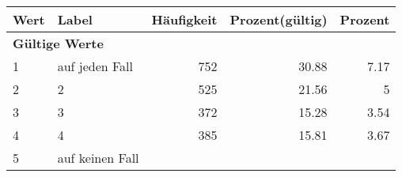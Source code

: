      \begin{longtable}{lXrrr}
     \toprule
     \textbf{Wert} & \textbf{Label} & \textbf{Häufigkeit} & \textbf{Prozent(gültig)} & \textbf{Prozent} \\
     \endhead
     \midrule
     \multicolumn{5}{l}{\textbf{Gültige Werte}}\\

     1 &
     \multicolumn{1}{X}{ auf jeden Fall   } &


       \num{752} &
       \num[round-mode=places,round-precision=2]{30.88} &
         \num[round-mode=places,round-precision=2]{7.17} \\

     2 &
     \multicolumn{1}{X}{ 2   } &


       \num{525} &
       \num[round-mode=places,round-precision=2]{21.56} &
         \num[round-mode=places,round-precision=2]{5} \\

     3 &
     \multicolumn{1}{X}{ 3   } &


       \num{372} &
       \num[round-mode=places,round-precision=2]{15.28} &
         \num[round-mode=places,round-precision=2]{3.54} \\

     4 &
     \multicolumn{1}{X}{ 4   } &


       \num{385} &
       \num[round-mode=places,round-precision=2]{15.81} &
         \num[round-mode=places,round-precision=2]{3.67} \\

     5 &
     \multicolumn{1}{X}{ auf keinen Fall   } &



\end{longtable}
